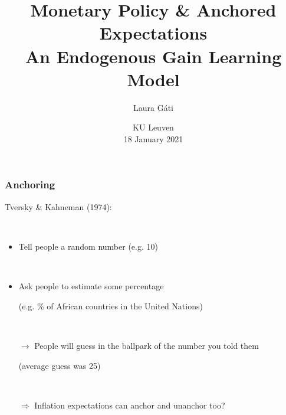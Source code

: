 \documentclass[10pt]{beamer}
\author[]{Laura G\'ati}
\institute[]{Boston College}
\title[]{Monetary Policy \& Anchored Expectations \\
An Endogenous Gain Learning Model}
\date[]{KU Leuven\\
\vspace{0.2cm}
18 January 2021}
\begin{document}
\begin{frame}[plain] %

\maketitle

\end{frame}




\begin{frame}
	\frametitle{Anchoring}
	\label{kahneman}

Tversky \& Kahneman (1974): 

\


\begin{itemize}
\item Tell people a random number (e.g. 10)

\

\item Ask people to estimate some percentage

\vspace{0.1cm}

\item[] (e.g. \% of African countries in the United Nations)

\

\pause
\item[$\rightarrow$] People will guess in the ballpark of the number you told them 

\vspace{0.1cm}


\item[] (average guess was 25)

\

\pause
\item[$\Rightarrow$] Inflation expectations can anchor and unanchor too?
\end{itemize}

	\end{frame}
\end{document}

